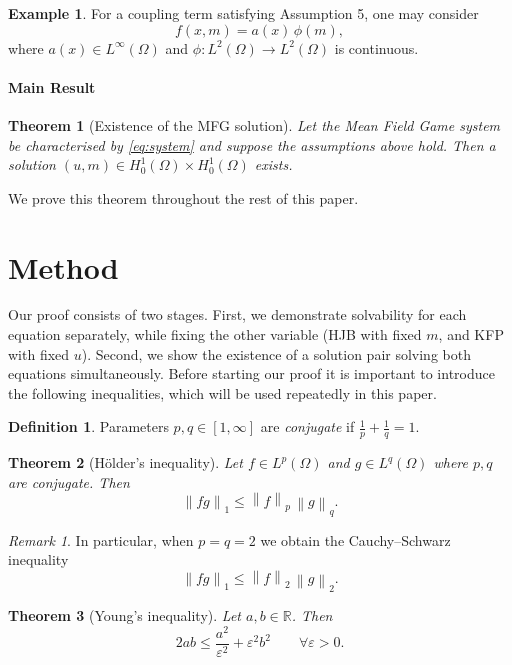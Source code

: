 \documentclass[11pt]{article}
\numberwithin{equation}{section}
\newtheorem{theorem}{Theorem}[section]
\theoremstyle{definition}
\newtheorem{definition}[definition]{Definition}
\newtheorem{example}[example]{Example}
\theoremstyle{remark}
\newtheorem{remark}[remark]{Remark}
\newcommand{\R}{\mathbb{R}}
\newcommand{\Ltwo}{L^2(\Omega)}
\newcommand{\Honez}{H_0^1(\Omega)}
\newcommand{\norm}[1]{\left\lVert #1 \right\rVert}
\begin{document}
\begin{example}
For a coupling term satisfying Assumption 5, one may consider
\[
f(x,m) = a(x)\,\phi(m),
\]
where $a(x) \in L^\infty(\Omega)$ and $\phi:\Ltwo\to\Ltwo$ is continuous.
\end{example}

\paragraph{Main Result}
\begin{theorem}[Existence of the MFG solution]\label{thm:main_result}
Let the Mean Field Game system be characterised by \cref{eq:system} and suppose the assumptions above hold.
Then a solution $(u,m) \in \Honez \times \Honez$ exists.
\end{theorem}

We prove this theorem throughout the rest of this paper.
\section{Method}

Our proof consists of two stages. First, we demonstrate solvability for each equation separately, while fixing the other variable (HJB with fixed $m$, and KFP with fixed $u$).
Second, we show the existence of a solution pair solving both equations simultaneously.
Before starting our proof it is important to introduce the following inequalities, which will be used repeatedly in this paper.

\begin{definition}
Parameters $p,q\in[1,\infty]$ are \emph{conjugate} if $\frac{1}{p}+\frac{1}{q}=1$.
\end{definition}

\begin{theorem}[Hölder's inequality]\label{thm:holder}
Let $f \in L^p(\Omega)$ and $g \in L^q(\Omega)$ where $p,q$ are conjugate. Then
\[
\norm{fg}_1 \le \norm{f}_p\,\norm{g}_q.
\]
\end{theorem}

\begin{remark}
In particular, when $p=q=2$ we obtain the Cauchy--Schwarz inequality
\[
\norm{fg}_1 \le \norm{f}_2\,\norm{g}_2.
\]
\end{remark}

\begin{theorem}[Young's inequality]\label{thm:youngs}
Let $a,b\in\R$. Then
\[
2ab \le \frac{a^2}{\varepsilon^2} + \varepsilon^2 b^2 \qquad \forall \varepsilon > 0.
\]
\end{theorem}
\end{document}
